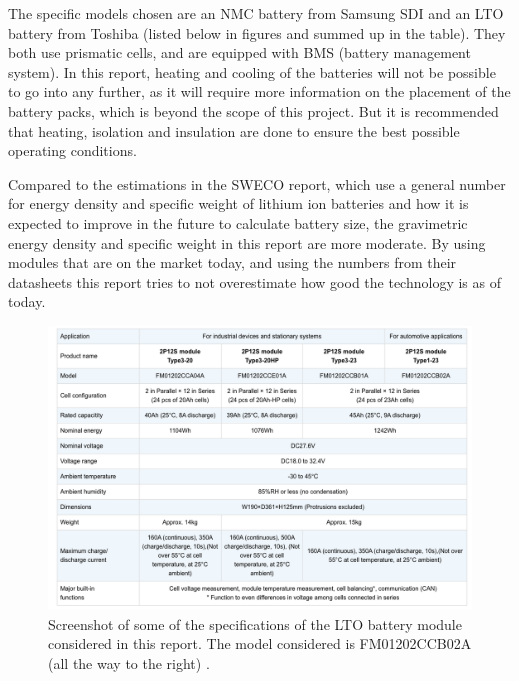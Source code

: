 \documentclass{article}
\begin{document}
The specific models chosen are an NMC battery from Samsung SDI and an LTO battery from Toshiba (listed below in figures and summed up in the table). They both use prismatic cells, and are equipped with BMS (battery management system). In this report, heating and cooling of the batteries will not be possible to go into any further, as it will require more information on the placement of the battery packs, which is beyond the scope of this project. But it is recommended that heating, isolation and insulation are done to ensure the best possible operating conditions.
 
Compared to the estimations in the SWECO report, which use a general number for energy density and specific weight of lithium ion batteries and how it is expected to improve in the future to calculate battery size, the gravimetric energy density and specific weight in this report are more moderate. By using modules that are on the market today, and using the numbers from their datasheets this report tries to not overestimate how good the technology is as of today.

\begin{figure}[H]
    \centering
    \includegraphics*[width=1\textwidth]{img/image13.png}
    \caption{Screenshot of some of the specifications of the LTO battery module considered in this report. The model considered is FM01202CCB02A (all the way to the right) \cite{2p12s}. %
    }
\end{figure}
\end{document}
